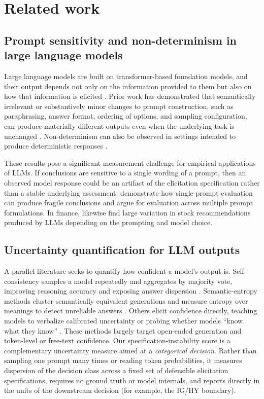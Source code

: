 \documentclass[a4paper,fleqn]{cas-sc}
\begin{document}
\section{Related work}
\subsection{Prompt sensitivity and non-determinism in large language models}
Large language models are built on transformer-based foundation models, and their output depends not only
on the information provided to them but also on how that information is elicited
\citep{vaswani2017attention,devlin2019bert,bommasani2021foundation}. Prior work has demonstrated that
semantically irrelevant or substantively minor changes to prompt construction, such as paraphrasing,
answer format, ordering of options, and sampling configuration, can produce materially different outputs
even when the underlying task is unchanged \citep{atil2024nondeterminism,sclar2024formatspread}.
Non-determinism can also be observed in settings intended to produce deterministic responses
\citep{atil2024nondeterminism}.

These results pose a significant measurement challenge for empirical applications of LLMs. If conclusions
are sensitive to a single wording of a prompt, then an observed model response could be an artifact of
the elicitation specification rather than a stable underlying assessment. \citet{mizrahi2024multiprompt}
demonstrate how single-prompt evaluation can produce fragile conclusions and argue for evaluation across
multiple prompt formulations. In finance, \citet{chon2025variability} likewise find large variation in
stock recommendations produced by LLMs depending on the prompting and model choice.

\subsection{Uncertainty quantification for LLM outputs}
A parallel literature seeks to quantify how confident a model's output is. Self-consistency samples a model
repeatedly and aggregates by majority vote, improving reasoning accuracy and exposing answer dispersion
\citep{wang2023selfconsistency}. Semantic-entropy methods cluster semantically equivalent generations and
measure entropy over meanings to detect unreliable answers \citep{kuhn2023semantic}. Others elicit
confidence directly, teaching models to verbalize calibrated uncertainty \citep{lin2022teaching} or
probing whether models ``know what they know'' \citep{kadavath2022language}. These methods largely target
open-ended generation and token-level or free-text confidence. Our specification-instability score is a
complementary uncertainty measure aimed at a \emph{categorical decision}. Rather than sampling one prompt
many times or reading token probabilities, it measures dispersion of the decision class across a fixed set
of defensible elicitation specifications, requires no ground truth or model internals, and reports directly
in the units of the downstream decision (for example, the IG/HY boundary).
\end{document}
